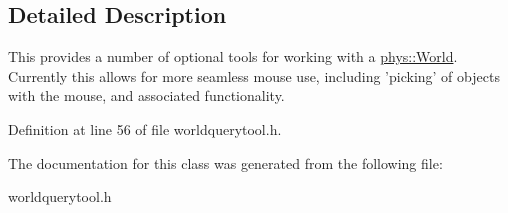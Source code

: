 \subsection{Detailed Description}
This provides a number of optional tools for working with a \hyperlink{classphys_1_1World}{phys::World}. Currently this allows for more seamless mouse use, including 'picking' of objects with the mouse, and associated functionality. 

Definition at line 56 of file worldquerytool.h.



The documentation for this class was generated from the following file:\begin{DoxyCompactItemize}
\item 
worldquerytool.h\end{DoxyCompactItemize}
